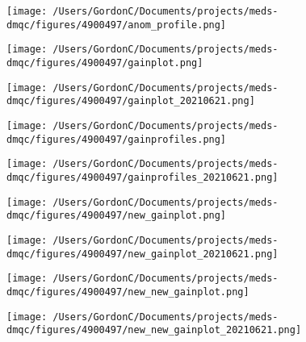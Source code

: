 \begin{figure}[H]
	\centering
	\texttt{[image: /Users/GordonC/Documents/projects/meds-dmqc/figures/4900497/anom\_profile.png]}
	\caption{}
\end{figure}


\begin{figure}[H]
	\centering
	\texttt{[image: /Users/GordonC/Documents/projects/meds-dmqc/figures/4900497/gainplot.png]}
	\caption{}
\end{figure}


\begin{figure}[H]
	\centering
	\texttt{[image: /Users/GordonC/Documents/projects/meds-dmqc/figures/4900497/gainplot\_20210621.png]}
	\caption{}
\end{figure}


\begin{figure}[H]
	\centering
	\texttt{[image: /Users/GordonC/Documents/projects/meds-dmqc/figures/4900497/gainprofiles.png]}
	\caption{}
\end{figure}


\begin{figure}[H]
	\centering
	\texttt{[image: /Users/GordonC/Documents/projects/meds-dmqc/figures/4900497/gainprofiles\_20210621.png]}
	\caption{}
\end{figure}


\begin{figure}[H]
	\centering
	\texttt{[image: /Users/GordonC/Documents/projects/meds-dmqc/figures/4900497/new\_gainplot.png]}
	\caption{}
\end{figure}


\begin{figure}[H]
	\centering
	\texttt{[image: /Users/GordonC/Documents/projects/meds-dmqc/figures/4900497/new\_gainplot\_20210621.png]}
	\caption{}
\end{figure}


\begin{figure}[H]
	\centering
	\texttt{[image: /Users/GordonC/Documents/projects/meds-dmqc/figures/4900497/new\_new\_gainplot.png]}
	\caption{}
\end{figure}


\begin{figure}[H]
	\centering
	\texttt{[image: /Users/GordonC/Documents/projects/meds-dmqc/figures/4900497/new\_new\_gainplot\_20210621.png]}
	\caption{}
\end{figure}


